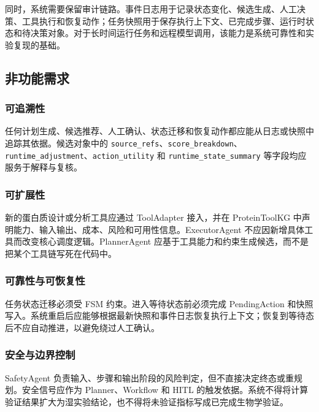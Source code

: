 同时，系统需要保留审计链路。事件日志用于记录状态变化、候选生成、人工决策、工具执行和恢复动作；任务快照用于保存执行上下文、已完成步骤、运行时状态和待决策对象。对于长时间运行任务和远程模型调用，该能力是系统可靠性和实验复现的基础。

\subsection{非功能需求}\label{ux975eux529fux80fdux9700ux6c42}

\subsubsection{可追溯性}\label{ux53efux8ffdux6eafux6027}

任何计划生成、候选推荐、人工确认、状态迁移和恢复动作都应能从日志或快照中追踪其依据。候选对象中的
\texttt{source\_refs}、\texttt{score\_breakdown}、\texttt{runtime\_adjustment}、\texttt{action\_utility}
和 \texttt{runtime\_state\_summary} 等字段均应服务于解释与复核。

\subsubsection{可扩展性}\label{ux53efux6269ux5c55ux6027}

新的蛋白质设计或分析工具应通过 ToolAdapter 接入，并在 ProteinToolKG
中声明能力、输入输出、成本、风险和可用性信息。ExecutorAgent
不应因新增具体工具而改变核心调度逻辑。PlannerAgent
应基于工具能力和约束生成候选，而不是把某个工具链写死在代码中。

\subsubsection{可靠性与可恢复性}\label{ux53efux9760ux6027ux4e0eux53efux6062ux590dux6027}

任务状态迁移必须受 FSM 约束。进入等待状态前必须完成 PendingAction
和快照写入。系统重启后应能够根据最新快照和事件日志恢复执行上下文；恢复到等待态后不应自动推进，以避免绕过人工确认。

\subsubsection{安全与边界控制}\label{ux5b89ux5168ux4e0eux8fb9ux754cux63a7ux5236}

SafetyAgent
负责输入、步骤和输出阶段的风险判定，但不直接决定终态或重规划。安全信号应作为
Planner、Workflow 和 HITL
的触发依据。系统不得将计算验证结果扩大为湿实验结论，也不得将未验证指标写成已完成生物学验证。

